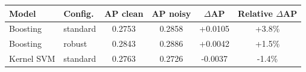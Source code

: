 \begin{tabular}{llcccc}
\toprule
Model & Config. & AP clean & AP noisy & $\Delta$AP & Relative $\Delta$AP \\
\midrule
Boosting & standard & 0.2753 & 0.2858 & +0.0105 & +3.8\% \\
Boosting & robust & 0.2843 & 0.2886 & +0.0042 & +1.5\% \\
\addlinespace
Kernel SVM & standard & 0.2763 & 0.2726 & -0.0037 & -1.4\% \\
\bottomrule
\end{tabular}
